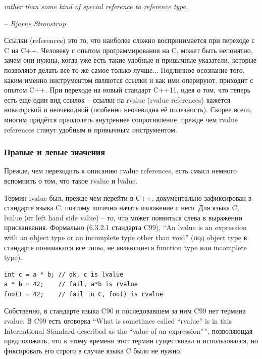 \documentclass[a4paper,12pt,oneside]{article}
\begin{document}
\hfill\textit{rather than some kind of special reference to reference type.} {\vspace{0.5em}}

\hfill\textit{-- Bjarne Stroustrup}

Ссылки (references) это то, что наиболее сложно воспринимается при переходе с C на C++. Человеку с опытом программирования на C, может быть непонятно, зачем они нужны, когда уже есть такие удобные и привычные указатели, которые позволяют делать всё то же самое только лучше... Подлинное осознание того, каким именно инструментом являются ссылки и как ими оперируют, приходит с опытом C++. При переходе на новый стандарт C++11, идея о том, что теперь есть ещё один вид ссылок -- ссылки на rvalue (rvalue references) кажется новаторской и неочевидной (особенно неочевидна её полезность). Скорее всего, многим придётся преодолеть внутреннее сопротивление, прежде чем rvalue references станут удобным и привычным инструментом. 

\subsubsection{Правые и левые значения}\label{LRvaluesAgain}

Прежде, чем переходить к описанию rvalue references, есть смысл немного вспомнить о том, что такое rvalue и lvalue.

Термин lvalue был, прежде чем перейти в C++, документально зафиксирован в стандарте языка C, поэтому логично начать изложение с него. Для языка C, lvalue (от left hand side value) -- то, что может появиться слева в выражении присваивания. Формально (6.3.2.1 стандарта C99), ``An lvalue is an expression with an object type or an incomplete type other than void'' (под object type в стандарте понимаются все типы, не являющиеся function type или incomplete type).

\begin{lstlisting}
int c = a * b; // ok, c is lvalue
a * b = 42;    // fail, a*b is rvalue
foo() = 42;    // fail in C, foo() is rvalue
\end{lstlisting}

Собственно, в стандарте языка C90 и последовавшем за ним C99 нет термина rvalue. В C99 есть оговорка ``What is sometimes called ``rvalue'' is in this International Standard described as the ``value of an expression'''', позволяющая предположить, что к этому времени этот термин существовал и использовался, но фиксировать его строго в случае языка C было не нужно.
\end{document}
